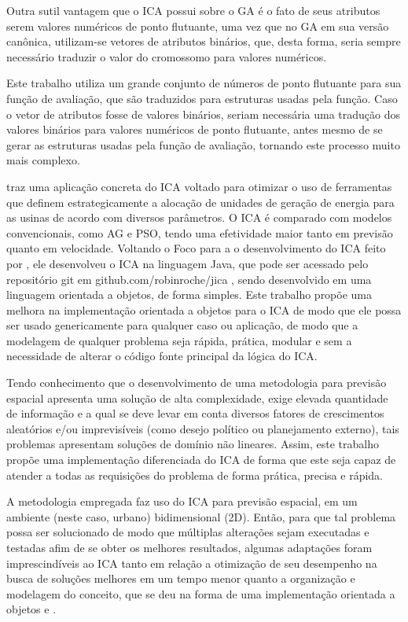 Outra sutil vantagem que o ICA possui sobre o GA é o fato de seus atributos serem valores numéricos de ponto flutuante, uma vez que no GA em sua versão canônica, utilizam-se vetores de atributos binários, que, desta forma, seria sempre necessário traduzir o valor do cromossomo para valores numéricos. 

Este trabalho utiliza um grande conjunto de números de ponto flutuante para sua função de avaliação, que são traduzidos para estruturas usadas pela função. Caso o vetor de atributos fosse de valores binários, seriam necessária uma tradução dos valores binários para valores numéricos de ponto flutuante, antes mesmo de se gerar as estruturas usadas pela função de avaliação, tornando este processo muito mais complexo.

\cite{roche2011imperialist} traz uma aplicação concreta do ICA voltado para otimizar o uso de ferramentas que definem estrategicamente a alocação de unidades de geração de energia para as usinas de acordo com diversos parâmetros. O ICA é comparado com modelos convencionais, como AG e PSO, tendo uma efetividade maior tanto em previsão quanto em velocidade. Voltando o Foco para a o desenvolvimento do ICA feito por \citeauthor{roche2011imperialist}, ele desenvolveu o ICA na linguagem Java, que pode ser acessado pelo repositório git em github.com/robinroche/jica \cite{jica}, sendo desenvolvido em uma linguagem orientada a objetos, de forma simples. Este trabalho propõe uma melhora na implementação orientada a objetos para o ICA de modo que ele possa ser usado genericamente para qualquer caso ou aplicação, de modo que a modelagem de qualquer problema seja rápida, prática, modular e sem a necessidade de alterar o código fonte principal da lógica do ICA. 

Tendo conhecimento que o desenvolvimento de uma metodologia para previsão espacial apresenta uma solução de alta complexidade, exige elevada quantidade de informação e a qual se deve levar em conta diversos fatores de crescimentos aleatórios e/ou imprevisíveis (como desejo político ou planejamento externo), tais problemas apresentam soluções de domínio não lineares. Assim, este trabalho propõe uma implementação diferenciada do ICA de forma que este seja capaz de atender a todas as requisições do problema de forma prática, precisa e rápida. 

A metodologia empregada faz uso do ICA para previsão espacial, em um ambiente (neste caso, urbano) bidimensional (2D). Então, para que tal problema possa ser solucionado de modo que múltiplas alterações sejam executadas e testadas afim de se obter os melhores resultados, algumas adaptações foram imprescindíveis ao ICA tanto em relação a otimização de seu desempenho na busca de soluções melhores em um tempo menor  quanto a organização e modelagem do conceito, que se deu na forma de uma implementação orientada a objetos \cite{booch1982object} e \cite{coad1991object}. 

